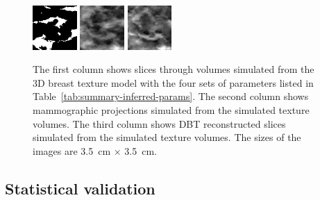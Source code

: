 \documentclass[journal]{IEEEtran}
\begin{document}
\begin{figure}[!htb]
  \includegraphics[width=0.15\textwidth]
  {figure/all/dataset_11/sim_vol_small}
  \includegraphics[width=0.15\textwidth]
  {figure/all/dataset_11/sim_proj}
  \includegraphics[width=0.15\textwidth]
  {figure/all/dataset_11/sim_recon}

  \caption{The first column shows slices through volumes simulated
    from the 3D breast texture model with the four sets of parameters
    listed in Table~\ref{tab:summary-inferred-params}. The second
    column shows mammographic projections simulated from the simulated
    texture volumes. The third column shows DBT reconstructed slices
    simulated from the simulated texture volumes. The sizes of the
    images are \SI{3.5}{\cm} $\times$ \SI{3.5}{\cm}.}
  \label{fig:fit-params-sims}
\end{figure}

\subsection{Statistical validation}
\label{sec:stat-valid}
\end{document}
